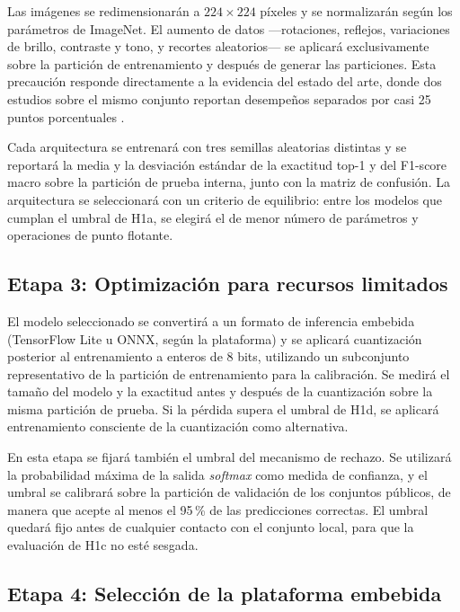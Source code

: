 Las imágenes se redimensionarán a $224\times224$ píxeles y se normalizarán
según los parámetros de ImageNet. El aumento de datos —rotaciones,
reflejos, variaciones de brillo, contraste y tono, y recortes aleatorios—
se aplicará exclusivamente sobre la partición de entrenamiento y después de
generar las particiones. Esta precaución responde directamente a la
evidencia del estado del arte, donde dos estudios sobre el mismo conjunto
reportan desempeños separados por casi 25 puntos porcentuales
\citep{kunduracioglu2024, huang2025}.

Cada arquitectura se entrenará con tres semillas aleatorias distintas y se
reportará la media y la desviación estándar de la exactitud top-1 y del
F1-score macro sobre la partición de prueba interna, junto con la matriz
de confusión. La arquitectura se seleccionará con un criterio de
equilibrio: entre los modelos que cumplan el umbral de H1a, se elegirá el de
menor número de parámetros y operaciones de punto flotante.

\subsection{Etapa 3: Optimización para recursos limitados}

El modelo seleccionado se convertirá a un formato de inferencia embebida
(TensorFlow Lite u ONNX, según la plataforma) y se aplicará cuantización
posterior al entrenamiento a enteros de 8 bits, utilizando un subconjunto
representativo de la partición de entrenamiento para la calibración. Se
medirá el tamaño del modelo y la exactitud antes y después de la
cuantización sobre la misma partición de prueba. Si la pérdida supera el
umbral de H1d, se aplicará entrenamiento consciente de la cuantización
como alternativa.

En esta etapa se fijará también el umbral del mecanismo de rechazo. Se
utilizará la probabilidad máxima de la salida \textit{softmax} como medida
de confianza, y el umbral se calibrará sobre la partición de validación de
los conjuntos públicos, de manera que acepte al menos el 95\,\% de las
predicciones correctas. El umbral quedará fijo antes de cualquier contacto
con el conjunto local, para que la evaluación de H1c no esté sesgada.

\subsection{Etapa 4: Selección de la plataforma embebida}

